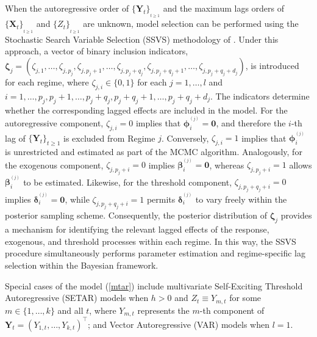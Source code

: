 When the autoregressive order of $\{\bm{Y}_t\}_{_{t\geq 1}}$ and the maximum lags orders of $\{\bm{X}_t\}_{_{t\geq 1}}$ and $\{Z_t\}_{_{t\geq 1}}$ are
unknown, model selection can be performed using the Stochastic Search Variable Selection (SSVS) methodology of \cite{GM93,GM95,GM97}. Under this approach, a vector of binary inclusion indicators, $\bm{\zeta}_j=(\zeta_{j,1},\ldots,\zeta_{j,p_j},\zeta_{j,p_j+1},\ldots,\zeta_{j,p_j+q_j},\zeta_{j,p_j+q_j+1},\ldots,\zeta_{j,p_j+q_j+d_j})$, is introduced for each regime, where $\zeta_{j,i}\in\{0,1\}$ for each $j=1,\ldots,l$ and $i=1,\ldots,p_j,p_j+1,\ldots,p_j+q_j,p_j+q_j+1,\ldots,p_j+q_j+d_j$. The indicators determine whether the corresponding lagged effects are included in the model. For the autoregressive component, $\zeta_{j,i}=0$ implies that $\bm{\phi}_i^{^{(j)}}=\mathbf{0}$, and therefore the $i$-th lag of $\{\bm{Y}_t\}_{t\geq 1}$ is excluded from Regime $j$. Conversely, $\zeta_{j,i}=1$ implies that $\bm{\phi}_i^{^{(j)}}$ is unrestricted and estimated as part of the MCMC algorithm. Analogously, for the exogenous component, $\zeta_{j,p_j+i}=0$ implies $\bm{\beta}_i^{^{(j)}}=\mathbf{0}$, whereas $\zeta_{j,p_j+i}=1$ allows $\bm{\beta}_i^{^{(j)}}$ to be estimated. Likewise, for the threshold component, $\zeta_{j,p_j+q_j+i}=0$ implies $\bm{\delta}_i^{^{(j)}}=\mathbf{0}$, while $\zeta_{j,p_j+q_j+i}=1$ permits $\bm{\delta}_i^{^{(j)}}$ to vary freely within the posterior sampling scheme. Consequently, the posterior distribution of $\bm{\zeta}_j$ provides a mechanism for identifying the relevant lagged effects of the response, exogenous, and threshold processes within each regime. In this way, the SSVS procedure simultaneously performs parameter estimation and regime-specific lag selection within the Bayesian framework.

Special cases of the model (\ref{mtar}) include multivariate Self-Exciting Threshold Autoregressive (SETAR) models when $h>0$ and $Z_t \equiv Y_{m,t}$ for some $m\in\{1,\ldots,k\}$ and all $t$, where $Y_{m,t}$ represents the $m$-th component of $\bm{Y}_t=(Y_{1,t},\ldots,Y_{k,t})^{\!\top}$; and Vector Autoregressive (VAR) models when $l=1$. 

